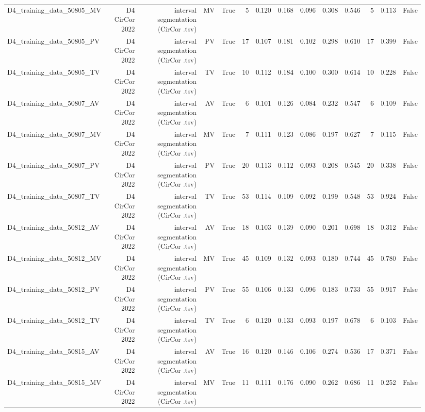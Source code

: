 \begin{table}[htbp]
\begin{tabular}{lrrrrrrrrrrrrr}
    D4\_training\_data\_50805\_MV & D4 CirCor 2022 & interval segmentation (CirCor .tsv) & MV & True & 5 & 0.120 & 0.168 & 0.096 & 0.308 & 0.546 & 5 & 0.113 & False \\
    D4\_training\_data\_50805\_PV & D4 CirCor 2022 & interval segmentation (CirCor .tsv) & PV & True & 17 & 0.107 & 0.181 & 0.102 & 0.298 & 0.610 & 17 & 0.399 & False \\
    D4\_training\_data\_50805\_TV & D4 CirCor 2022 & interval segmentation (CirCor .tsv) & TV & True & 10 & 0.112 & 0.184 & 0.100 & 0.300 & 0.614 & 10 & 0.228 & False \\
    D4\_training\_data\_50807\_AV & D4 CirCor 2022 & interval segmentation (CirCor .tsv) & AV & True & 6 & 0.101 & 0.126 & 0.084 & 0.232 & 0.547 & 6 & 0.109 & False \\
    D4\_training\_data\_50807\_MV & D4 CirCor 2022 & interval segmentation (CirCor .tsv) & MV & True & 7 & 0.111 & 0.123 & 0.086 & 0.197 & 0.627 & 7 & 0.115 & False \\
    D4\_training\_data\_50807\_PV & D4 CirCor 2022 & interval segmentation (CirCor .tsv) & PV & True & 20 & 0.113 & 0.112 & 0.093 & 0.208 & 0.545 & 20 & 0.338 & False \\
    D4\_training\_data\_50807\_TV & D4 CirCor 2022 & interval segmentation (CirCor .tsv) & TV & True & 53 & 0.114 & 0.109 & 0.092 & 0.199 & 0.548 & 53 & 0.924 & False \\
    D4\_training\_data\_50812\_AV & D4 CirCor 2022 & interval segmentation (CirCor .tsv) & AV & True & 18 & 0.103 & 0.139 & 0.090 & 0.201 & 0.698 & 18 & 0.312 & False \\
    D4\_training\_data\_50812\_MV & D4 CirCor 2022 & interval segmentation (CirCor .tsv) & MV & True & 45 & 0.109 & 0.132 & 0.093 & 0.180 & 0.744 & 45 & 0.780 & False \\
    D4\_training\_data\_50812\_PV & D4 CirCor 2022 & interval segmentation (CirCor .tsv) & PV & True & 55 & 0.106 & 0.133 & 0.096 & 0.183 & 0.733 & 55 & 0.917 & False \\
    D4\_training\_data\_50812\_TV & D4 CirCor 2022 & interval segmentation (CirCor .tsv) & TV & True & 6 & 0.120 & 0.133 & 0.093 & 0.197 & 0.678 & 6 & 0.103 & False \\
    D4\_training\_data\_50815\_AV & D4 CirCor 2022 & interval segmentation (CirCor .tsv) & AV & True & 16 & 0.120 & 0.146 & 0.106 & 0.274 & 0.536 & 17 & 0.371 & False \\
    D4\_training\_data\_50815\_MV & D4 CirCor 2022 & interval segmentation (CirCor .tsv) & MV & True & 11 & 0.111 & 0.176 & 0.090 & 0.262 & 0.686 & 11 & 0.252 & False \\

\end{tabular}
\end{table}
